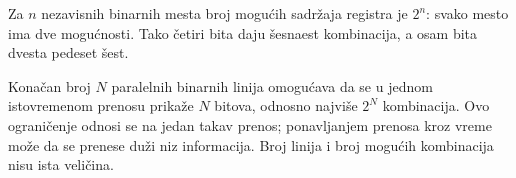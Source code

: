 
Za $n$ nezavisnih binarnih mesta broj mogućih sadržaja registra je $2^n$: svako mesto ima dve mogućnosti. Tako četiri bita daju šesnaest kombinacija, a osam bita dvesta pedeset šest.

Konačan broj $N$ paralelnih binarnih linija omogućava da se u jednom istovremenom prenosu prikaže $N$ bitova, odnosno najviše $2^N$ kombinacija. Ovo ograničenje odnosi se na jedan takav prenos; ponavljanjem prenosa kroz vreme može da se prenese duži niz informacija. Broj linija i broj mogućih kombinacija nisu ista veličina.
